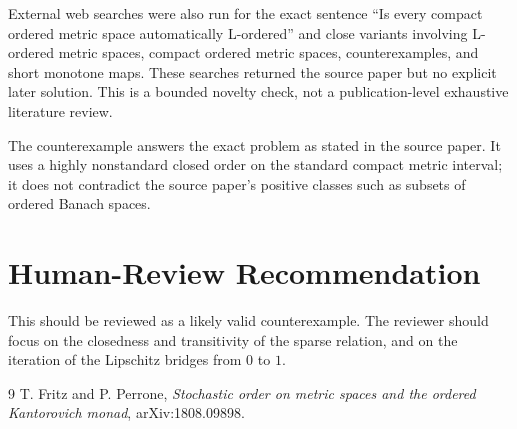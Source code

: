 \documentclass[11pt]{article}
\begin{document}
External web searches were also run for the exact sentence ``Is every compact
ordered metric space automatically L-ordered'' and close variants involving
L-ordered metric spaces, compact ordered metric spaces, counterexamples, and
short monotone maps.  These searches returned the source paper but no explicit
later solution.  This is a bounded novelty check, not a publication-level
exhaustive literature review.

The counterexample answers the exact problem as stated in the source paper.
It uses a highly nonstandard closed order on the standard compact metric
interval; it does not contradict the source paper's positive classes such as
subsets of ordered Banach spaces.

\section*{Human-Review Recommendation}

This should be reviewed as a likely valid counterexample.  The reviewer should
focus on the closedness and transitivity of the sparse relation, and on the
iteration of the Lipschitz bridges from $0$ to $1$.

\begin{thebibliography}{9}
T. Fritz and P. Perrone,
\emph{Stochastic order on metric spaces and the ordered Kantorovich monad},
arXiv:1808.09898.
\end{thebibliography}
\end{document}
